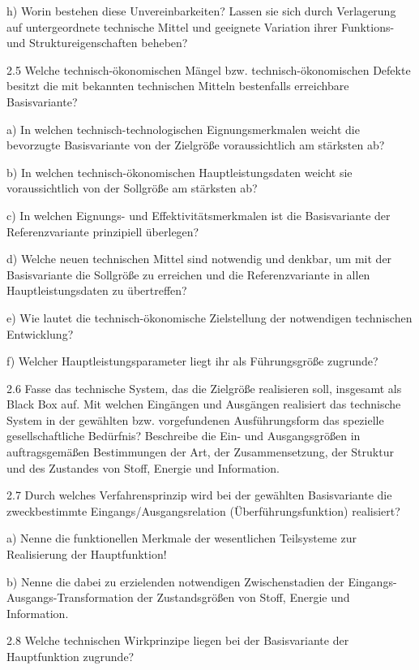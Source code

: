 \documentclass[12pt,a4paper]{article}
\begin{document}
h) Worin bestehen diese Unvereinbarkeiten? Lassen sie sich durch Verlagerung
auf untergeordnete technische Mittel und geeignete Variation ihrer Funktions-
und Struktureigenschaften beheben?

2.5 Welche technisch-ökonomischen Mängel bzw. technisch-ökonomischen Defekte
besitzt die mit bekannten technischen Mitteln bestenfalls erreichbare
Basisvariante?

a) In welchen technisch-technologischen Eignungsmerkmalen weicht die bevorzugte
Basisvariante von der Zielgröße voraussichtlich am stärksten ab?

b) In welchen technisch-ökonomischen Hauptleistungsdaten weicht sie
voraussichtlich von der Sollgröße am stärksten ab?

c) In welchen Eignungs- und Effektivitätsmerkmalen ist die Basisvariante der
Referenzvariante prinzipiell überlegen?

d) Welche neuen technischen Mittel sind notwendig und denkbar, um mit der
Basisvariante die Sollgröße zu erreichen und die Referenzvariante in allen
Hauptleistungsdaten zu übertreffen?

e) Wie lautet die technisch-ökonomische Zielstellung der notwendigen
technischen Entwicklung?

f) Welcher Hauptleistungsparameter liegt ihr als Führungsgröße zugrunde?

2.6 Fasse das technische System, das die Zielgröße realisieren soll, insgesamt
als Black Box auf. Mit welchen Eingängen und Ausgängen realisiert das
technische System in der gewählten bzw. vorgefundenen Ausführungsform das
spezielle gesellschaftliche Bedürfnis?  Beschreibe die Ein- und Ausgangsgrößen
in auftragsgemäßen Bestimmungen der Art, der Zusammensetzung, der Struktur und
des Zustandes von Stoff, Energie und Information.

2.7 Durch welches Verfahrensprinzip wird bei der gewählten Basisvariante die
zweckbestimmte Eingangs/Ausgangsrelation (Überführungsfunktion) realisiert?

a) Nenne die funktionellen Merkmale der wesentlichen Teilsysteme zur
Realisierung der Hauptfunktion!

b) Nenne die dabei zu erzielenden notwendigen Zwischenstadien der
Eingangs-Ausgangs-Transformation der Zustandsgrößen von Stoff, Energie und
Information.

2.8 Welche technischen Wirkprinzipe liegen bei der Basisvariante der
Hauptfunktion zugrunde?
\end{document}
